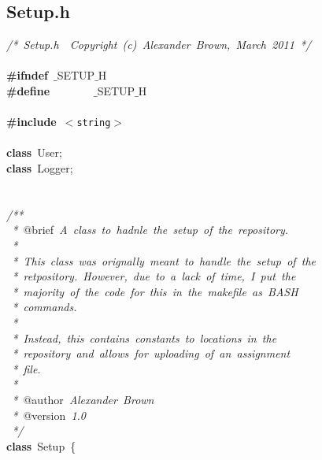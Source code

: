 \clearpage
\normalsize
\rmfamily
\subsection{Setup.h}
\scriptsize
\sffamily
\noindent
\mbox{}\textit{/*\ Setup.h\ \ Copyright\ (c)\ Alexander\ Brown,\ March\ 2011\ */} \\
\mbox{} \\
\mbox{}\textbf{\#ifndef}\ $\_$SETUP$\_$H \\
\mbox{}\textbf{\#define}\ \ \ \ \ \ \ \ $\_$SETUP$\_$H \\
\mbox{} \\
\mbox{}\textbf{\#include}\ \texttt{$<$string$>$} \\
\mbox{} \\
\mbox{}\textbf{class}\ User; \\
\mbox{}\textbf{class}\ Logger; \\
\mbox{} \\
\mbox{} \\
\mbox{}\textit{/**} \\
\mbox{}\textit{\ *\ }@brief\textit{\ A\ class\ to\ hadnle\ the\ setup\ of\ the\ repository.} \\
\mbox{}\textit{\ *} \\
\mbox{}\textit{\ *\ This\ class\ was\ orignally\ meant\ to\ handle\ the\ setup\ of\ the} \\
\mbox{}\textit{\ *\ retpository.\ However,\ due\ to\ a\ lack\ of\ time,\ I\ put\ the} \\
\mbox{}\textit{\ *\ majority\ of\ the\ code\ for\ this\ in\ the\ makefile\ as\ BASH} \\
\mbox{}\textit{\ *\ commands.} \\
\mbox{}\textit{\ *} \\
\mbox{}\textit{\ *\ Instead,\ this\ contains\ constants\ to\ locations\ in\ the} \\
\mbox{}\textit{\ *\ repository\ and\ allows\ for\ uploading\ of\ an\ assignment} \\
\mbox{}\textit{\ *\ file.} \\
\mbox{}\textit{\ *} \\
\mbox{}\textit{\ *\ }@author\textit{\ Alexander\ Brown} \\
\mbox{}\textit{\ *\ }@version\textit{\ 1.0} \\
\mbox{}\textit{\ */} \\
\mbox{}\textbf{class}\ Setup\ \{ \\

